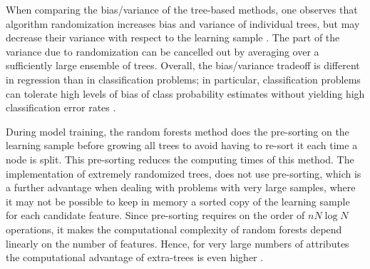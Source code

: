 When comparing the bias/variance of the tree-based methods, one observes that algorithm randomization increases bias and variance of individual trees, but  may decrease their variance with respect to the learning sample \citep{geurts2006extremely}. The part of the variance due to randomization can be cancelled out by averaging over a
sufficiently large ensemble of trees. Overall, the bias/variance tradeoff is different in regression than in classification problems;
in particular, classification problems can tolerate high levels of bias of class probability estimates without yielding high classification error rates \citep{geurts2006extremely}. 

During model training, the random forests method does the pre-sorting on the learning sample before growing all trees to avoid having to re-sort it each time a node is split. This pre-sorting reduces the computing times of this method. The implementation of extremely randomized trees, does not use pre-sorting, which is a further advantage when dealing with problems with very large samples, where it may not be possible to keep in memory a sorted copy of the learning sample for each candidate feature. Since pre-sorting requires on the order of $nN\log N$ operations, it makes the
computational complexity of random forests depend linearly on the number of features. Hence, for very large numbers of attributes the computational advantage of extra-trees is even higher \citep{geurts2006extremely}.



